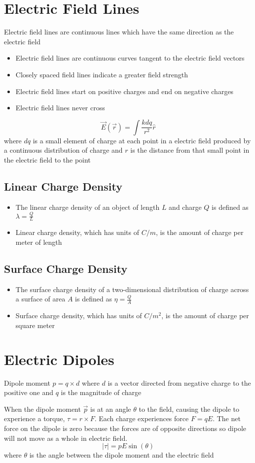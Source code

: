 \documentclass{article}
\begin{document}
\setlength{\parindent}{0pt}
\setlength{\parskip}{1em}
\section*{Electric Field Lines}
Electric field lines are continuous lines which have the same direction as the electric field

\begin{itemize}
    \item Electric field lines are continuous curves tangent to the electric field vectors
    \item Closely spaced field lines indicate a greater field strength
    \item Electric field lines start on positive charges and end on negative charges
    \item Electric field lines never cross
\end{itemize}

\[\vec{E}(\vec{r})=\int \frac{kdq}{r^2}\hat{r}\]
where $dq$ is a small element of charge at each point in a electric field produced by a continuous
distribution of charge and $r$ is the distance from that small point in the electric field to the
point

\subsection*{Linear Charge Density}
\begin{itemize}
    \item The linear charge density of an object of length $L$ and charge $Q$ is defined as
    $\lambda=\frac{Q}{L}$
    \item Linear charge density, which has units of $C/m$, is the amount of charge per meter of
    length
\end{itemize}

\subsection*{Surface Charge Density}
\begin{itemize}
    \item The surface charge density of a two-dimensional distribution of charge across a surface
    of area $A$ is defined as $\eta = \frac{Q}{A}$
    \item Surface charge density, which has units of $C/m^2$, is the amount of charge per square
    meter
\end{itemize}

\section*{Electric Dipoles}
Dipole moment $p=q\times d$ where $d$ is a vector directed from negative charge to the positive one
and $q$ is the magnitude of charge

When the dipole moment $\vec{p}$ is at an angle $\theta$ to the field, causing the dipole to
experience a torque, $\tau = r\times F$. Each charge experiences force $F=qE$. The net force on the
dipole is zero because the forces are of opposite directions so dipole will not move as a whole in
electric field.
\[|\tau | = pE\sin (\theta)\] where $\theta$ is the angle between the dipole moment and the
electric field
\end{document}
